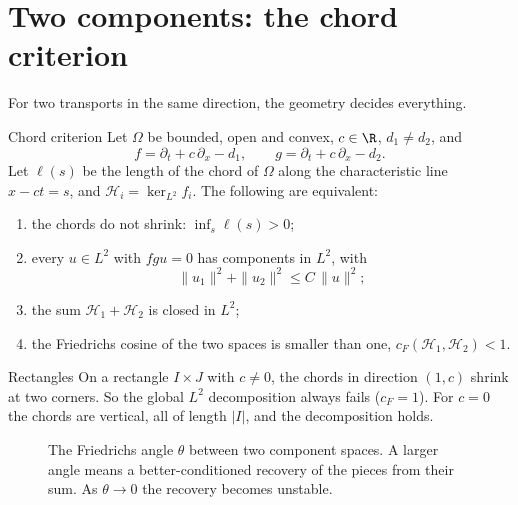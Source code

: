 \section{Two components: the chord criterion}

For two transports in the same direction, the geometry decides everything.

\begin{theorem}{Chord criterion  \proved}\label{thm:chord}
Let $\Omega$ be bounded, open and convex, $c\in\R$, $d_1\ne d_2$, and
\[
f=\partial_t+c\,\partial_x-d_1,\qquad g=\partial_t+c\,\partial_x-d_2 .
\]
Let $\ell(s)$ be the length of the chord of $\Omega$ along the characteristic line $x-ct=s$, and $\mathcal H_i=\ker_{L^2}f_i$. The following are equivalent:
\begin{enumerate}[label=(\alph*)]
\item the chords do not shrink: $\inf_s\ell(s)>0$;
\item every $u\in L^2$ with $fgu=0$ has components in $L^2$, with
\[
\|u_1\|^2+\|u_2\|^2\le C\,\|u\|^2 ;
\]
\item the sum $\mathcal H_1+\mathcal H_2$ is closed in $L^2$;
\item the Friedrichs cosine of the two spaces is smaller than one, $c_F(\mathcal H_1,\mathcal H_2)<1$.
\end{enumerate}
\end{theorem}

\begin{example}{Rectangles}
On a rectangle $I\times J$ with $c\ne0$, the chords in direction $(1,c)$ shrink at two corners. So the global $L^2$ decomposition always fails ($c_F=1$). For $c=0$ the chords are vertical, all of length $|I|$, and the decomposition holds.
\end{example}

\begin{figure}[!htb]
\centering
{}
\caption{The Friedrichs angle $\theta$ between two component spaces. A larger angle means a better-conditioned recovery of the pieces from their sum. As $\theta\to0$ the recovery becomes unstable.}\label{fig:friedrichs}
\end{figure}

